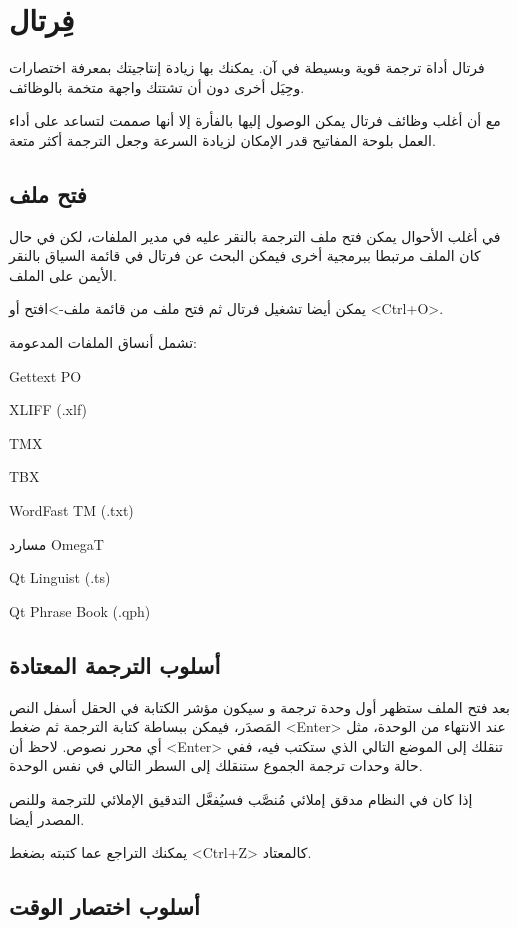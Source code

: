 \section{فِرتال}
فرتال أداة ترجمة قوية وبسيطة في آن. يمكنك بها زيادة إنتاجيتك بمعرفة
اختصارات وحِيَل أخرى دون أن تشتتك واجهة متخمة بالوظائف.

مع أن أغلب وظائف فرتال يمكن الوصول إليها بالفأرة إلا أنها صممت لتساعد
على أداء العمل بلوحة المفاتيح قدر الإمكان لزيادة السرعة وجعل الترجمة
أكثر متعة.

\subsection{فتح ملف}
في أغلب الأحوال يمكن فتح ملف الترجمة بالنقر عليه في مدير الملفات، لكن في
حال كان الملف مرتبطا ببرمجية أخرى فيمكن البحث عن فرتال في قائمة السياق
بالنقر الأيمن على الملف.

يمكن أيضا تشغيل فرتال ثم فتح ملف من قائمة ملف->افتح أو <Ctrl+O>.

تشمل أنساق الملفات المدعومة:

\startitemize[1]
\item Gettext PO
\item {\sc XLIFF} (.xlf)
\item {\sc TMX}
\item {\sc TBX}
\item WordFast TM (.txt)
\item مسارد OmegaT
\item Qt Linguist (.ts)
\item Qt Phrase Book (.qph)
\stopitemize
\subsection{أسلوب الترجمة المعتادة}
بعد فتح الملف ستظهر أول وحدة ترجمة و سيكون مؤشر الكتابة في الحقل أسفل
النص المَصدَر، فيمكن ببساطة كتابة الترجمة ثم ضغط <Enter> عند الانتهاء
من الوحدة، مثل أي محرر نصوص. لاحظ أن <Enter> تنقلك إلى الموضع التالي
الذي ستكتب فيه، ففي حالة وحدات ترجمة الجموع ستنقلك إلى السطر التالي في
نفس الوحدة.

إذا كان في النظام مدقق إملائي مُنصَّب فسيُفعَّل التدقيق الإملائي للترجمة
وللنص المصدر أيضا.

يمكنك التراجع عما كتبته بضغط <Ctrl+Z> كالمعتاد.

\subsection{أسلوب اختصار الوقت}
